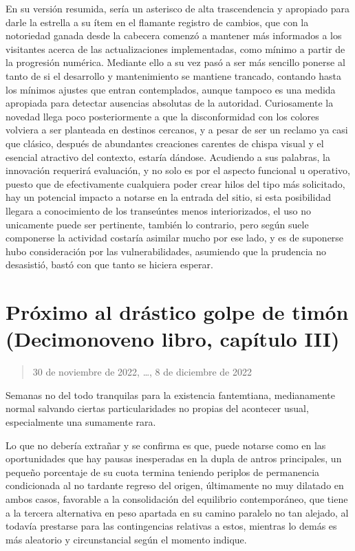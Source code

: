 \documentclass[
]{book}
\begin{document}
En su versión resumida, sería un asterisco de alta trascendencia y apropiado para darle la estrella a su ítem en el flamante registro de cambios, que con la notoriedad ganada desde la cabecera comenzó a mantener más informados a los visitantes acerca de las actualizaciones implementadas, como mínimo a partir de la progresión numérica. Mediante ello a su vez pasó a ser más sencillo ponerse al tanto de si el desarrollo y mantenimiento se mantiene trancado, contando hasta los mínimos ajustes que entran contemplados, aunque tampoco es una medida apropiada para detectar ausencias absolutas de la autoridad. Curiosamente la novedad llega poco posteriormente a que la disconformidad con los colores volviera a ser planteada en destinos cercanos, y a pesar de ser un reclamo ya casi que clásico, después de abundantes creaciones carentes de chispa visual y el esencial atractivo del contexto, estaría dándose. Acudiendo a sus palabras, la innovación requerirá evaluación, y no solo es por el aspecto funcional u operativo, puesto que de efectivamente cualquiera poder crear hilos del tipo más solicitado, hay un potencial impacto a notarse en la entrada del sitio, si esta posibilidad llegara a conocimiento de los transeúntes menos interiorizados, el uso no unicamente puede ser pertinente, también lo contrario, pero según suele componerse la actividad costaría asimilar mucho por ese lado, y es de suponerse hubo consideración por las vulnerabilidades, asumiendo que la prudencia no desasistió, bastó con que tanto se hiciera esperar.

\hypertarget{pruxf3ximo-al-druxe1stico-golpe-de-timuxf3n-decimonoveno-libro-capuxedtulo-iii}{%
\section{Próximo al drástico golpe de timón (Decimonoveno libro, capítulo III)}\label{pruxf3ximo-al-druxe1stico-golpe-de-timuxf3n-decimonoveno-libro-capuxedtulo-iii}}

\begin{quote}
30 de noviembre de 2022, \ldots, 8 de diciembre de 2022
\end{quote}

Semanas no del todo tranquilas para la existencia fantemtiana, medianamente normal salvando ciertas particularidades no propias del acontecer usual, especialmente una sumamente rara.

Lo que no debería extrañar y se confirma es que, puede notarse como en las oportunidades que hay pausas inesperadas en la dupla de antros principales, un pequeño porcentaje de su cuota termina teniendo periplos de permanencia condicionada al no tardante regreso del origen, últimamente no muy dilatado en ambos casos, favorable a la consolidación del equilibrio contemporáneo, que tiene a la tercera alternativa en peso apartada en su camino paralelo no tan alejado, al todavía prestarse para las contingencias relativas a estos, mientras lo demás es más aleatorio y circunstancial según el momento indique.
\end{document}
